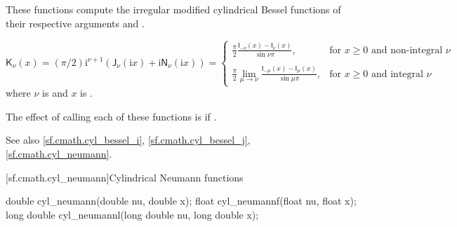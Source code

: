 \begin{itemdescr}

\pnum\effects
These functions compute
the irregular modified cylindrical Bessel functions
of their respective arguments
 and .

\pnum\returns
\[%
  \mathsf{K}_\nu(x) =
  (\pi/2)\mathrm{i}^{\nu+1} (            \mathsf{J}_\nu(\mathrm{i}x)
			    + \mathrm{i} \mathsf{N}_\nu(\mathrm{i}x)
			    )
  =
  \left\{
  \begin{array}{cl}
  \displaystyle
  \frac{\pi}{2}
  \frac{\mathsf{I}_{-\nu}(x) - \mathsf{I}_{\nu}(x)}
       {\sin \nu\pi },
  & \mbox{for $x \ge 0$ and non-integral $\nu$}
  \\
  \\
  \displaystyle
  \frac{\pi}{2}
  \lim_{\mu \rightarrow \nu} \frac{\mathsf{I}_{-\mu}(x) - \mathsf{I}_{\mu}(x)}
                                  {\sin \mu\pi },
  & \mbox{for $x \ge 0$ and integral $\nu$}
  \end{array}
  \right.
\]
where
$\nu$ is  and
$x$ is .

\pnum\remarks
The effect of calling each of these functions
is 
if .

\pnum See also \ref{sf.cmath.cyl_bessel_i}, \ref{sf.cmath.cyl_bessel_j}, \ref{sf.cmath.cyl_neumann}.
\end{itemdescr}

[sf.cmath.cyl_neumann]{Cylindrical Neumann functions}%
%
%
%
%
%
%
\begin{itemdecl}
double       cyl_neumann(double nu, double x);
float        cyl_neumannf(float nu, float x);
long double  cyl_neumannl(long double nu, long double x);
\end{itemdecl}

